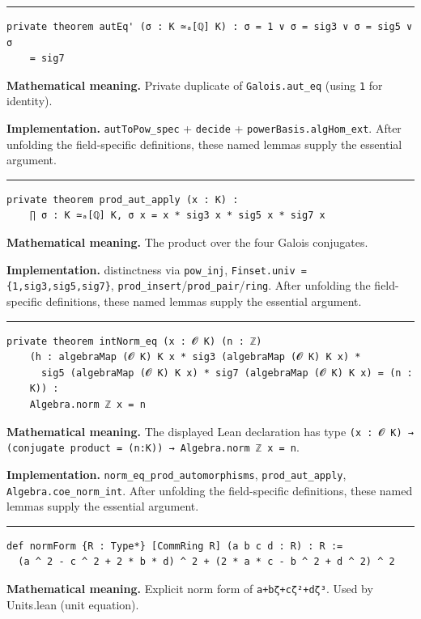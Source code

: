 \documentclass[UTF8,a4paper,11pt,fontset=fandol]{ctexart}
\theoremstyle{definition}
\newcommand{\statementsep}{\par\medskip\hrule\medskip}
\begin{document}
\statementsep
\begin{verbatim}
private theorem autEq' (σ : K ≃ₐ[ℚ] K) : σ = 1 ∨ σ = sig3 ∨ σ = sig5 ∨ σ
    = sig7
\end{verbatim}
\noindent\textbf{Mathematical meaning.} Private duplicate of \texttt{Galois.\allowbreak{}aut\_\allowbreak{}eq} (using \texttt{1} for identity).\par
\noindent\textbf{Implementation.} \texttt{autToPow\_\allowbreak{}spec} + \texttt{decide} + \texttt{powerBasis.\allowbreak{}algHom\_\allowbreak{}ext}. After unfolding the field-specific definitions, these named lemmas supply the essential argument.\par
\statementsep
\begin{verbatim}
private theorem prod_aut_apply (x : K) :
    ∏ σ : K ≃ₐ[ℚ] K, σ x = x * sig3 x * sig5 x * sig7 x
\end{verbatim}
\noindent\textbf{Mathematical meaning.} The product over the four Galois conjugates.\par
\noindent\textbf{Implementation.} distinctness via \texttt{pow\_\allowbreak{}inj}, \texttt{Finset.\allowbreak{}univ = \{1,sig3,sig5,sig7\}}, \texttt{prod\_\allowbreak{}insert}/\texttt{prod\_\allowbreak{}pair}/\texttt{ring}. After unfolding the field-specific definitions, these named lemmas supply the essential argument.\par
\statementsep
\begin{verbatim}
private theorem intNorm_eq (x : 𝓞 K) (n : ℤ)
    (h : algebraMap (𝓞 K) K x * sig3 (algebraMap (𝓞 K) K x) *
      sig5 (algebraMap (𝓞 K) K x) * sig7 (algebraMap (𝓞 K) K x) = (n :
    K)) :
    Algebra.norm ℤ x = n
\end{verbatim}
\noindent\textbf{Mathematical meaning.} The displayed Lean declaration has type \texttt{(x : 𝓞 K) → (conjugate product = (n:K)) → Algebra.\allowbreak{}norm ℤ x = n}.\par
\noindent\textbf{Implementation.} \texttt{norm\_\allowbreak{}eq\_\allowbreak{}prod\_\allowbreak{}automorphisms}, \texttt{prod\_\allowbreak{}aut\_\allowbreak{}apply}, \texttt{Algebra.\allowbreak{}coe\_\allowbreak{}norm\_\allowbreak{}int}. After unfolding the field-specific definitions, these named lemmas supply the essential argument.\par
\statementsep
\begin{verbatim}
def normForm {R : Type*} [CommRing R] (a b c d : R) : R :=
  (a ^ 2 - c ^ 2 + 2 * b * d) ^ 2 + (2 * a * c - b ^ 2 + d ^ 2) ^ 2
\end{verbatim}
\noindent\textbf{Mathematical meaning.} Explicit norm form of \texttt{a+bζ+cζ²+dζ³}. Used by Units.lean (unit equation).\par
\end{document}
